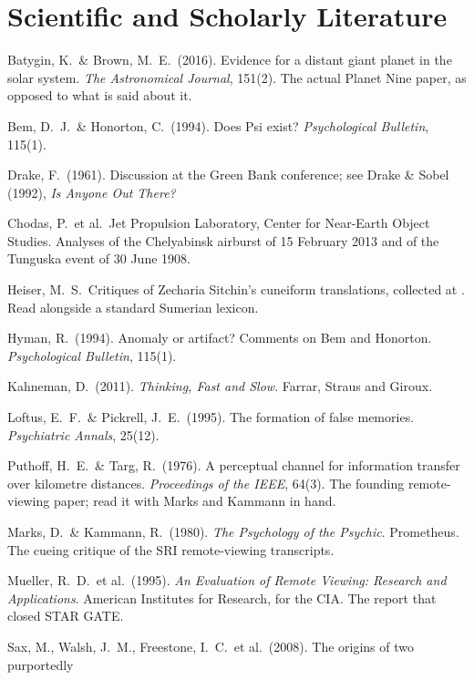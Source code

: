 \section*{Scientific and Scholarly Literature}

\begin{list}{}{\setlength{\leftmargin}{1.2em}\setlength{\itemindent}{-1.2em}
\setlength{\itemsep}{3pt}}
\item Batygin, K.\ \& Brown, M.\ E.\ (2016). Evidence for a distant giant planet in the solar
system. \emph{The Astronomical Journal}, 151(2). The actual Planet Nine paper, as opposed to what
is said about it.
\item Bem, D.\ J.\ \& Honorton, C.\ (1994). Does Psi exist? \emph{Psychological Bulletin}, 115(1).
\item Drake, F.\ (1961). Discussion at the Green Bank conference; see Drake \& Sobel (1992),
\emph{Is Anyone Out There?}
\item Chodas, P.\ et al.\ Jet Propulsion Laboratory, Center for Near-Earth Object Studies.
Analyses of the Chelyabinsk airburst of 15 February 2013 and of the Tunguska event of 30 June 1908.
\item Heiser, M.\ S.\ Critiques of Zecharia Sitchin's cuneiform translations, collected at
. Read alongside a standard Sumerian lexicon.
\item Hyman, R.\ (1994). Anomaly or artifact? Comments on Bem and Honorton. \emph{Psychological
Bulletin}, 115(1).
\item Kahneman, D.\ (2011). \emph{Thinking, Fast and Slow}. Farrar, Straus and Giroux.
\item Loftus, E.\ F.\ \& Pickrell, J.\ E.\ (1995). The formation of false memories.
\emph{Psychiatric Annals}, 25(12).
\item Puthoff, H.\ E.\ \& Targ, R.\ (1976). A perceptual channel for information transfer over
kilometre distances. \emph{Proceedings of the IEEE}, 64(3). The founding remote-viewing paper;
read it with Marks and Kammann in hand.
\item Marks, D.\ \& Kammann, R.\ (1980). \emph{The Psychology of the Psychic}. Prometheus. The
cueing critique of the SRI remote-viewing transcripts.
\item Mueller, R.\ D.\ et al.\ (1995). \emph{An Evaluation of Remote Viewing: Research and
Applications}. American Institutes for Research, for the CIA. The report that closed STAR GATE.
\item Sax, M., Walsh, J.\ M., Freestone, I.\ C.\ et al.\ (2008). The origins of two purportedly

\end{list}
